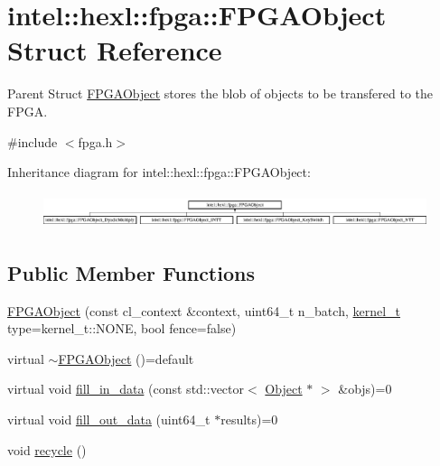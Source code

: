 \hypertarget{structintel_1_1hexl_1_1fpga_1_1FPGAObject}{\section{intel\-:\-:hexl\-:\-:fpga\-:\-:F\-P\-G\-A\-Object Struct Reference}
\label{structintel_1_1hexl_1_1fpga_1_1FPGAObject}
}


Parent Struct \hyperlink{structintel_1_1hexl_1_1fpga_1_1FPGAObject}{F\-P\-G\-A\-Object} stores the blob of objects to be transfered to the F\-P\-G\-A.  




{\ttfamily \#include $<$fpga.\-h$>$}

Inheritance diagram for intel\-:\-:hexl\-:\-:fpga\-:\-:F\-P\-G\-A\-Object\-:\begin{figure}[H]
\begin{center}
\leavevmode
\includegraphics[height=1.033210cm]{structintel_1_1hexl_1_1fpga_1_1FPGAObject}
\end{center}
\end{figure}
\subsection*{Public Member Functions}
\begin{DoxyCompactItemize}
\item 
\hyperlink{structintel_1_1hexl_1_1fpga_1_1FPGAObject_a389464365379dab126715a0dcf1ba922}{F\-P\-G\-A\-Object} (const cl\-\_\-context \&context, uint64\-\_\-t n\-\_\-batch, \hyperlink{namespaceintel_1_1hexl_1_1fpga_a9f07798cd59a71b9f57156192f7bf2f6}{kernel\-\_\-t} type=kernel\-\_\-t\-::\-N\-O\-N\-E, bool fence=false)
\item 
virtual \hyperlink{structintel_1_1hexl_1_1fpga_1_1FPGAObject_adecdea2bd81579b973e9292045c8d400}{$\sim$\-F\-P\-G\-A\-Object} ()=default
\item 
virtual void \hyperlink{structintel_1_1hexl_1_1fpga_1_1FPGAObject_abd665113bfb3b0e7a33e09078f01ae43}{fill\-\_\-in\-\_\-data} (const std\-::vector$<$ \hyperlink{structintel_1_1hexl_1_1fpga_1_1Object}{Object} $\ast$ $>$ \&objs)=0
\item 
virtual void \hyperlink{structintel_1_1hexl_1_1fpga_1_1FPGAObject_a954c4c75077a7c406f6c81517ea7bb04}{fill\-\_\-out\-\_\-data} (uint64\-\_\-t $\ast$results)=0
\item 
void \hyperlink{structintel_1_1hexl_1_1fpga_1_1FPGAObject_a0131d230161e662b63af86099177beb7}{recycle} ()
\end{DoxyCompactItemize}
